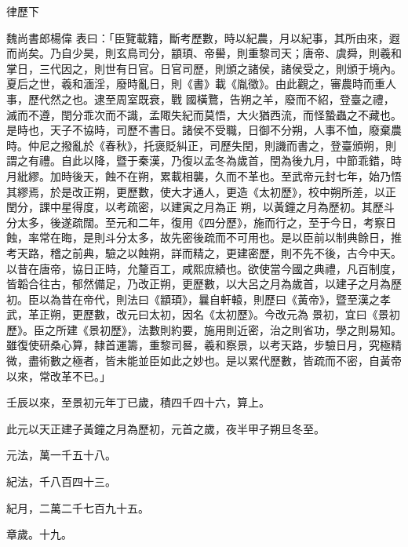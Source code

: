 
\begin{pinyinscope}

 律歷下



 魏尚書郎楊偉
 表曰：「臣覽載籍，斷考歷數，時以紀農，月以紀事，其所由來，遐而尚矣。乃自少昊，則玄鳥司分，顓頊、帝嚳，則重黎司天；唐帝、虞舜，則羲和掌日，三代因之，則世有日官。日官司歷，則頒之諸侯，諸侯受之，則頒于境內。夏后之世，羲和湎淫，廢時亂日，則《書》載《胤徵》。由此觀之，審農時而重人事，歷代然之也。逮至周室既衰，戰
 國橫鶩，告朔之羊，廢而不紹，登臺之禮，滅而不遵，閏分乖次而不識，孟陬失紀而莫悟，大火猶西流，而怪蟄蟲之不藏也。是時也，天子不協時，司歷不書日。諸侯不受職，日御不分朔，人事不恤，廢棄農時。仲尼之撥亂於《春秋》，托褒貶糾正，司歷失閏，則譏而書之，登臺頒朔，則謂之有禮。自此以降，暨于秦漢，乃復以孟冬為歲首，閏為後九月，中節乖錯，時月紕繆。加時後天，蝕不在朔，累載相襲，久而不革也。至武帝元封七年，始乃悟其繆焉，於是改正朔，更歷數，使大才通人，更造《太初歷》，校中朔所差，以正閏分，課中星得度，以考疏密，以建寅之月為正
 朔，以黃鐘之月為歷初。其歷斗分太多，後遂疏闊。至元和二年，復用《四分歷》，施而行之，至于今日，考察日蝕，率常在晦，是則斗分太多，故先密後疏而不可用也。是以臣前以制典餘日，推考天路，稽之前典，驗之以蝕朔，詳而精之，更建密歷，則不先不後，古今中天。以昔在唐帝，協日正時，允釐百工，咸熙庶績也。欲使當今國之典禮，凡百制度，皆韜合往古，郁然備足，乃改正朔，更歷數，以大呂之月為歲首，以建子之月為歷初。臣以為昔在帝代，則法曰《顓頊》，曩自軒轅，則歷曰《黃帝》，暨至漢之孝武，革正朔，更歷數，改元曰太初，因名《太初歷》。今改元為
 景初，宜曰《景初歷》。臣之所建《景初歷》，法數則約要，施用則近密，治之則省功，學之則易知。雖復使研桑心算，隸首運籌，重黎司晷，羲和察景，以考天路，步驗日月，究極精微，盡術數之極者，皆未能並臣如此之妙也。是以累代歷數，皆疏而不密，自黃帝以來，常改革不已。」



 壬辰以來，至景初元年丁已歲，積四千四十六，算上。



 此元以天正建子黃鐘之月為歷初，元首之歲，夜半甲子朔旦冬至。



 元法，萬一千五十八。



 紀法，千八百四十三。



 紀月，二萬二千七百九十五。



 章歲。十九。




\end{pinyinscope}

